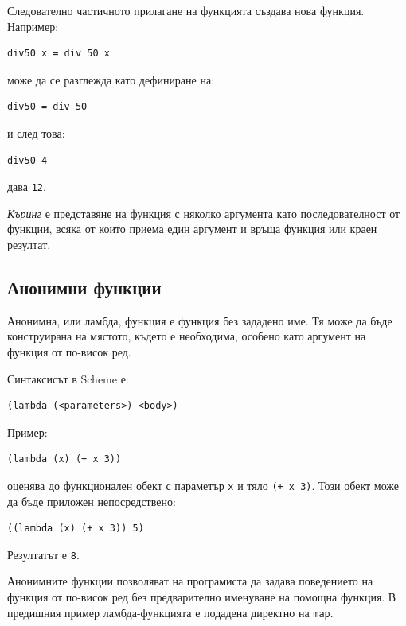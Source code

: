 Следователно частичното прилагане на функцията създава нова функция. Например:

\begin{verbatim}
div50 x = div 50 x
\end{verbatim}

може да се разглежда като дефиниране на:

\begin{verbatim}
div50 = div 50
\end{verbatim}

и след това:

\begin{verbatim}
div50 4
\end{verbatim}

дава \texttt{12}.

\begin{defn}
\emph{Къринг} е представяне на функция с няколко аргумента като последователност от функции, всяка от които приема един аргумент и връща функция или краен резултат.
\end{defn}

\subsection{Анонимни функции}\label{s:19.4.3}

Анонимна, или ламбда, функция е функция без зададено име. Тя може да бъде конструирана на мястото, където е необходима, особено като аргумент на функция от по-висок ред.

Синтаксисът в Scheme е:

\begin{verbatim}
(lambda (<parameters>) <body>)
\end{verbatim}

Пример:

\begin{verbatim}
(lambda (x) (+ x 3))
\end{verbatim}

оценява до функционален обект с параметър \texttt{x} и тяло \texttt{(+ x 3)}. Този обект може да бъде приложен непосредствено:

\begin{verbatim}
((lambda (x) (+ x 3)) 5)
\end{verbatim}

Резултатът е \texttt{8}.

Анонимните функции позволяват на програмиста да задава поведението на функция от по-висок ред без предварително именуване на помощна функция. В предишния пример ламбда-функцията е подадена директно на \texttt{map}.

